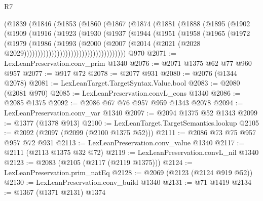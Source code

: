 \begin{lexlean}{R7}
\begin{coremodule}
                      (@1839
                        (@1846
                          (@1853
                            (@1860
                              (@1867
                                (@1874
                                  (@1881
                                    (@1888
                                      (@1895
                                        (@1902
                                          (@1909
                                            (@1916
                                              (@1923
                                                (@1930
                                                  (@1937
                                                    (@1944
                                                      (@1951
                                                        (@1958
                                                          (@1965
                                                            (@1972
                                                              (@1979
                                                                (@1986
                                                                  (@1993
                                                                    (@2000
                                                                      (@2007
                                                                        (@2014
                                                                          (@2021
                                                                            (@2028
                                                                              @2029)))))))))))))))))))))))))))))))))))))
    @970
@2071 := LexLeanPreservation.conv_prim @1340
@2076 := @2071 @1375 @62 @77 @960 @957
@2077 := @917 @72
@2078 := @2077 @931
@2080 := @2076 (@1344 @2078)
@2081 := LexLeanTarget.TargetSyntax.Value.bool
@2083 := @2080 (@2081 @970)
@2085 := LexLeanPreservation.convL_cons @1340
@2086 := @2085 @1375
@2092 := @2086 @67 @76 @957 @959 @1343 @2078
@2094 := LexLeanPreservation.conv_var @1340
@2097 := @2094 @1375 @52 @1343
@2099 := @1377 (@1378 @913)
@2100 := LexLeanTarget.TargetSemantics.lookup
@2105 := @2092 (@2097 (@2099 (@2100 @1375 @52)))
@2111 := @2086 @73 @75 @957 @957 @72 @931
@2113 := LexLeanPreservation.conv_value @1340
@2117 := @2111 (@2113 @1375 @32 @72)
@2119 := LexLeanPreservation.convL_nil @1340
@2123 := @2083 (@2105 (@2117 (@2119 @1375)))
@2124 := LexLeanPreservation.prim_natEq
@2128 := @2069 (@2123 (@2124 @919 @52))
@2130 := LexLeanPreservation.conv_build @1340
@2131 := @71 @1419
@2134 := @1367 (@1371 @2131) @1374

\end{coremodule}
\end{lexlean}
